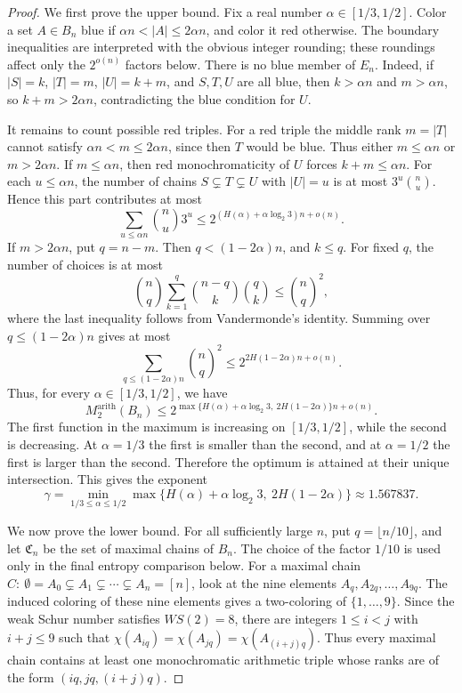 \documentclass[twoside,12pt]{article}
\begin{document}
\begin{proof}
We first prove the upper bound. Fix a real number
\(\alpha\in[1/3,1/2]\). Color a set \(A\in B_n\) blue if
$\alpha n<|A|\leq 2\alpha n$,
and color it red otherwise. The boundary inequalities are interpreted with the obvious integer rounding; these roundings affect only the \(2^{o(n)}\) factors below. There is no blue member of \(E_n\). Indeed, if
\(|S|=k\), \(|T|=m\), \(|U|=k+m\), and \(S,T,U\) are all blue, then
\(k>\alpha n\) and \(m>\alpha n\), so \(k+m>2\alpha n\), contradicting the
blue condition for \(U\).

It remains to count possible red triples. For a red triple the middle rank \(m=|T|\) cannot satisfy \(\alpha n<m\leq2\alpha n\), since then \(T\) would be blue. Thus either \(m\leq\alpha n\) or \(m>2\alpha n\). If \(m\leq\alpha n\), then red
monochromaticity of \(U\) forces \(k+m\leq\alpha n\). For each
\(u\leq\alpha n\), the number of chains \(S\subsetneq T\subsetneq U\) with
\(|U|=u\) is at most \(3^u\binom nu\). Hence this part contributes at most
\[
\sum_{u\leq \alpha n}\binom nu3^u
\leq
2^{(H(\alpha)+\alpha\log_2 3)n+o(n)}.
\]
If \(m>2\alpha n\), put \(q=n-m\). Then \(q<(1-2\alpha)n\), and
\(k\leq q\). For fixed \(q\), the number of choices is at most
\[
\binom nq\sum_{k=1}^{q}\binom{n-q}{k}\binom qk
\leq \binom nq^2,
\]
where the last inequality follows from Vandermonde's identity.  Summing over
\(q\leq(1-2\alpha)n\) gives at most
\[
\sum_{q\leq(1-2\alpha)n}\binom nq^2
\leq
2^{2H(1-2\alpha)n+o(n)}.
\]
Thus, for every \(\alpha\in[1/3,1/2]\), we have 
\[
M^{\mathrm{arith}}_2(B_n)
\leq
2^{\max\{H(\alpha)+\alpha\log_2 3,\ 2H(1-2\alpha)\}n+o(n)}.
\]
The first function in the maximum is increasing on \([1/3,1/2]\), while the
second is decreasing. At \(\alpha=1/3\) the first is smaller than the second,
and at \(\alpha=1/2\) the first is larger than the second. Therefore the
optimum is attained at their unique intersection. This gives the exponent
\[
\gamma
=
\min_{1/3\leq\alpha\leq1/2}
\max\{H(\alpha)+\alpha\log_2 3,\ 2H(1-2\alpha)\}
\approx
1.567837.
\]

We now prove the lower bound. For all sufficiently large \(n\), put \(q=\lfloor n/10\rfloor\), and let
\(\mathfrak C_n\) be the set of maximal chains of \(B_n\). The choice of the factor \(1/10\) is used only in the final entropy comparison below. For a maximal chain
$C:\ \emptyset=A_0\subsetneq A_1\subsetneq\cdots\subsetneq A_n=[n]$,
look at the nine elements \(A_q,A_{2q},\dots,A_{9q}\). The induced coloring of
these nine elements gives a two-coloring of \(\{1,\dots,9\}\).  Since the weak
Schur number satisfies \(WS(2)=8\), there are integers \(1\leq i<j\) with
\(i+j\leq9\) such that
$\chi(A_{iq})=\chi(A_{jq})=\chi(A_{(i+j)q})$.
Thus every maximal chain contains at least one monochromatic arithmetic triple
whose ranks are of the form \((iq,jq,(i+j)q)\).


\end{proof}
\end{document}
